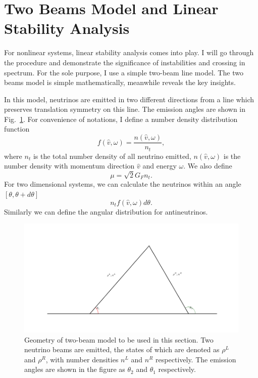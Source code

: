 \section{\label{chap:dr-sec:two-beams}Two Beams Model and Linear Stability Analysis}

For nonlinear systems, linear stability analysis comes into play. I will go through the procedure and demonstrate the significance of instabilities and crossing in spectrum. For the sole purpose, I use a simple two-beam line model. The two beams model is simple mathematically, meanwhile reveals the key insights.

In this model, neutrinos are emitted in two different directions from a line which preserves translation symmetry on this line. The emission angles are shown in Fig.~\ref{chap:dr-sec:two-beams-fig:two-beam-line-model}. For convenience of notations, I define a number density distribution function
\begin{equation}
   f(\hat v,\omega)= \frac{n(\hat v,\omega)}{n_t}, 
\end{equation}
where $n_t$ is the total number density of all neutrino emitted, $n(\hat v,\omega)$ is the number density with momentum direction $\hat v$ and energy $\omega$.
We also define
\begin{equation}
   \mu = \sqrt{2}G_F n_t. 
\end{equation}
For two dimensional systems, we can calculate the neutrinos within an angle $[\theta,\theta+d\theta]$
\begin{equation}
   n_t f(\hat v,\omega) d\theta. 
\end{equation}
Similarly we can define the angular distribution for antineutrinos.


\begin{figure}[!htbp]
    \centering
    \includegraphics[width=\textwidth]{chapters/assets/dr/two-beam-line-model.png}
    \caption{Geometry of two-beam model to be used in this section. Two neutrino beams are emitted, the states of which are denoted as $\rho^L$ and $\rho^R$, with number densities $n^L$ and $n^R$ respectively. The emission angles are shown in the figure as $\theta_2$ and $\theta_1$ respectively. }
    \label{chap:dr-sec:two-beams-fig:two-beam-line-model}
\end{figure}



